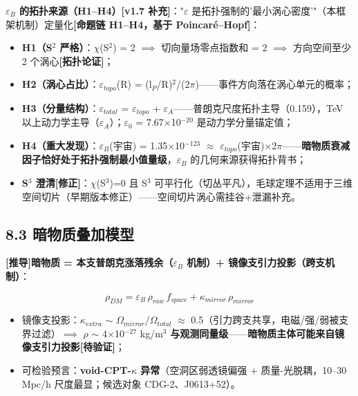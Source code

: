 \documentclass[12pt]{article}
\newcommand{\mtag}[1]{\textbf{[#1]}}
\newcommand{\up}[1]{\ensuremath{^{#1}}}
\newcommand{\down}[1]{\ensuremath{_{#1}}}
\begin{document}
\textbf{\ensuremath{\varepsilon}\down{B} 的拓扑来源（H1--H4）\mtag{v1.7 补充}}："\ensuremath{\varepsilon} 是拓扑强制的'最小涡心密度'"（本框架机制）定量化\mtag{命题链 H1--H4，基于 Poincar\'{e}--Hopf}：
\begin{itemize}
\item \textbf{H1（S\up{2} 严格）}：\ensuremath{\chi}(S\up{2}) = 2 \ensuremath{\implies} 切向量场零点指数和 = 2 \ensuremath{\implies} 方向空间至少 2 个涡心\mtag{拓扑论证}；
\item \textbf{H2（涡心占比）}：\ensuremath{\varepsilon}\down{topo}(R) = (l\down{P}/R)\up{2}/(2\ensuremath{\pi})------事件方向落在涡心单元的概率；
\item \textbf{H3（分量结构）}：\ensuremath{\varepsilon}\down{total} = \ensuremath{\varepsilon}\down{topo} + \ensuremath{\varepsilon}\down{A}------普朗克尺度拓扑主导（0.159），TeV 以上动力学主导（\ensuremath{\varepsilon}\down{A}）；\ensuremath{\varepsilon}\down{0} = 7.67\ensuremath{\times}10\up{-20} 是动力学分量锚定值；
\item \textbf{H4（重大发现）}：\ensuremath{\varepsilon}\down{B}(宇宙) = 1.35\ensuremath{\times}10\up{-123} \ensuremath{\approx} \ensuremath{\varepsilon}\down{topo}(宇宙)\ensuremath{\times}2\ensuremath{\pi}------\textbf{暗物质衰减因子恰好处于拓扑强制最小值量级}，\ensuremath{\varepsilon}\down{B} 的几何来源获得拓扑背书；
\item \textbf{S\up{3} 澄清\mtag{修正}}：\ensuremath{\chi}(S\up{3})=0 且 S\up{3} 可平行化（切丛平凡），毛球定理不适用于三维空间切片（早期版本修正）------空间切片涡心需挂谷+泄漏补充。
\end{itemize}

\subsection{8.3 暗物质叠加模型}

\mtag{推导}\textbf{暗物质 = 本支普朗克涨落残余（\ensuremath{\varepsilon}\down{B} 机制）+ 镜像支引力投影（跨支机制）}：

\[\rho_{DM} = \varepsilon_B\,\rho_{raw}\,f_{space} + \kappa_{mirror}\,\rho_{mirror}\]

\begin{itemize}
\item 镜像支投影：\ensuremath{\kappa}\down{extra} \ensuremath{\sim} \ensuremath{\Omega}\down{mirror}/\ensuremath{\Omega}\down{total} \ensuremath{\approx} 0.5（引力跨支共享，电磁/强/弱被支界过滤）\ensuremath{\implies} \ensuremath{\rho} \ensuremath{\sim} 4\ensuremath{\times}10\up{-27} kg/m\up{3} \textbf{与观测同量级}------\textbf{暗物质主体可能来自镜像支引力投影}\mtag{待验证}；
\item 可检验预言：\textbf{void-CPT-\ensuremath{\kappa} 异常}（空洞区弱透镜偏强 + 质量-光脱耦，10--30 Mpc/h 尺度最显；候选对象 CDG-2、J0613+52）。
\end{itemize}
\end{document}
